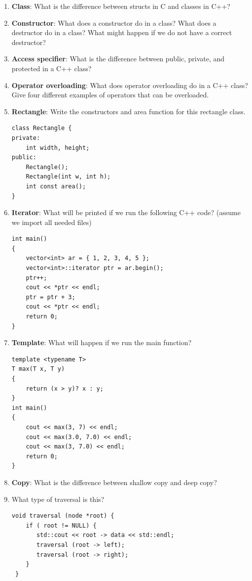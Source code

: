 \documentclass{article}
\begin{document}
\begin{enumerate}[label=(\alph*), itemsep = 120pt]
    \item \textbf{Class}: What is the difference between structs in C and classes in C++?
    
    \item \textbf{Constructor}: What does a constructor do in a class? What does a destructor do in a class? What might happen if we do not have a correct destructor?
    
    \item \textbf{Access specifier}: What is the difference between public, private, and protected in a C++ class?
    
    \item \textbf{Operator overloading}: What does operator overloading do in a C++ class? Give four different examples of operators that can be overloaded.
    
    \item \textbf{Rectangle}: Write the constructors and area function for this rectangle class.
    \begin{lstlisting}[style=CStyle]
class Rectangle {
private:
    int width, height;
public:
    Rectangle();
    Rectangle(int w, int h);
    int const area();
}
\end{lstlisting}
    \item \textbf{Iterator}: What will be printed if we run the following C++ code? (assume we import all needed files)
    \begin{lstlisting}[style=CStyle]
    int main() 
{ 
    vector<int> ar = { 1, 2, 3, 4, 5 }; 
    vector<int>::iterator ptr = ar.begin(); 
    ptr++;
    cout << *ptr << endl; 
    ptr = ptr + 3;
    cout << *ptr << endl; 
    return 0; 
}
\end{lstlisting}
    \item \textbf{Template}: What will happen if we run the main function?
    \begin{lstlisting}[style=CStyle]
template <typename T>
T max(T x, T y)
{
    return (x > y)? x : y;
}
int main()
{
    cout << max(3, 7) << endl;
    cout << max(3.0, 7.0) << endl;
    cout << max(3, 7.0) << endl;
    return 0;
}
\end{lstlisting}
    \item \textbf{Copy}: What is the difference between shallow copy and deep copy?


    \item \textbf{} What type of traversal is this?
    \begin{lstlisting}[style=CStyle]
void traversal (node *root) {
    if ( root != NULL) {
       std::cout << root -> data << std::endl;
       traversal (root -> left);
       traversal (root -> right);
    }
 }
    \end{lstlisting}


\end{enumerate}
\end{document}
